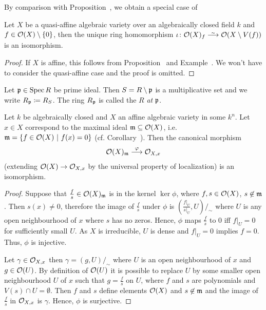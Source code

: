 \documentclass[a4paper,parskip=half,numbers=enddot, DIV=12]{scrreprt}
\begin{document}
	By comparison with Proposition~, we obtain a special case of
	\begin{prop}
		Let $X$ be a quasi-affine algebraic variety over an algebraically closed field $k$ and $f\in\mathcal{O}(X)\setminus\{0\}$, then the unique ring homomorphism $\iota\colon\Oo(X)_f \isomorphism\Oo(X\setminus V(f))$ is an isomorphism.
	\end{prop}
	\begin{proof}
		If $X$ is affine, this follows from Proposition~ and Example~. We won't have to consider the quasi-affine case and the proof is omitted.
	\end{proof}
	\begin{defi}
		Let $\mathfrak{p}\in\operatorname{Spec} R$ be prime ideal. Then $S=R\setminus \mathfrak{p}$ is a multiplicative set and we write $R_{\mathfrak{p}} \coloneqq R_S$. The ring $R_{\mathfrak{p}}$ is called the  $R$ \emph{at} $\mathfrak{p}$. 
	\end{defi}
	\begin{prop}
		Let $k$ be algebraically closed and $X$ an affine algebraic variety in some $k^n$. Let $x\in X$ correspond to the maximal ideal $\mathfrak{m}\subseteq \mathcal{O}(X)$, i.e. $\mathfrak{m} = \left\{f\in\mathcal{O}(X)\ \middle|\  f(x) = 0\right\}$ (cf. Corollary~). Then the canonical morphism
		\begin{align*}
			\Oo(X)_\mm \morphism[\phi] \Oo_{X,x}
		\end{align*}
		(extending $\mathcal{O}(X) \to \mathcal{O}_{X,x}$ by the universal property of localization) is an isomorphism.
	\end{prop}
	\begin{proof}
		Suppose that $\frac{f}{s}\in\mathcal{O}(X)_{\mathfrak{m}}$ is in the kernel $\ker\phi$, where $f,s\in\mathcal{O}(X)$, $s\not\in\mathfrak{m}$. Then $s(x)\not=0$, therefore the image of $\frac{f}{s}$ under $\phi$ is $\left(\frac{f|_U}{s|_U},U\right)/_\sim$ where $U$ is any open neighbourhood of $x$ where $s$ has no zeros. Hence, $\phi$ maps $\frac fs$ to $0$ iff $f|_U = 0$ for sufficiently small $U$. As $X$ is irreducible, $U$ is dense and $f|_U = 0$ implies $f=0$. Thus, $\phi$ is injective.
		
		 Let $\gamma \in \mathcal{O}_{X,x}$ then $\gamma = (g, U)/_\sim$ where $U$ is an open neighbourhood of $x$ and $g\in \mathcal{O}(U)$. By definition of $\mathcal{O}(U)$ it is possible to replace $U$ by some smaller open neighbourhood $U$ of $x$ such that $g= \frac{f}{s}$ on $U$, where $f$ and $s$ are polynomials and $V(s)\cap U = \emptyset$. Then $f$ and $s$ define elements $\mathcal{O}(X)$ and $s\not\in \mathfrak{m}$ and the image of $\frac{f}{s}$ in $\mathcal{O}_{X,x}$ is $\gamma$. Hence, $\phi$ is surjective.
	\end{proof}
\end{document}

